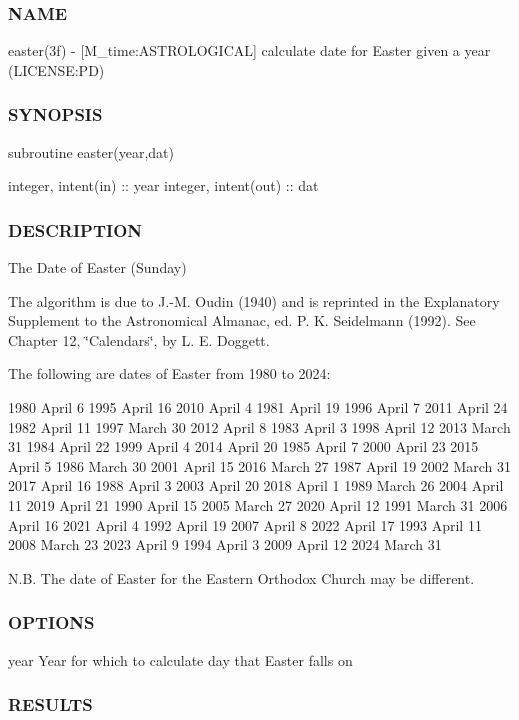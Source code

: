 \subsubsection*{N\+A\+ME}

easter(3f) -\/ \mbox{[}M\+\_\+time\+:A\+S\+T\+R\+O\+L\+O\+G\+I\+C\+AL\mbox{]} calculate date for Easter given a year (L\+I\+C\+E\+N\+SE\+:PD) 

\subsubsection*{S\+Y\+N\+O\+P\+S\+IS}

subroutine easter(year,dat)

integer, intent(in) \+:\+: year integer, intent(out) \+:\+: dat

\subsubsection*{D\+E\+S\+C\+R\+I\+P\+T\+I\+ON}

The Date of Easter (Sunday)

The algorithm is due to J.-\/M. Oudin (1940) and is reprinted in the Explanatory Supplement to the Astronomical Almanac, ed. P. K. Seidelmann (1992). See Chapter 12, \char`\"{}\+Calendars\char`\"{}, by L. E. Doggett.

The following are dates of Easter from 1980 to 2024\+:

1980 April 6 1995 April 16 2010 April 4 1981 April 19 1996 April 7 2011 April 24 1982 April 11 1997 March 30 2012 April 8 1983 April 3 1998 April 12 2013 March 31 1984 April 22 1999 April 4 2014 April 20 1985 April 7 2000 April 23 2015 April 5 1986 March 30 2001 April 15 2016 March 27 1987 April 19 2002 March 31 2017 April 16 1988 April 3 2003 April 20 2018 April 1 1989 March 26 2004 April 11 2019 April 21 1990 April 15 2005 March 27 2020 April 12 1991 March 31 2006 April 16 2021 April 4 1992 April 19 2007 April 8 2022 April 17 1993 April 11 2008 March 23 2023 April 9 1994 April 3 2009 April 12 2024 March 31

N.\+B. The date of Easter for the Eastern Orthodox Church may be different.

\subsubsection*{O\+P\+T\+I\+O\+NS}

year Year for which to calculate day that Easter falls on \subsubsection*{R\+E\+S\+U\+L\+TS}


